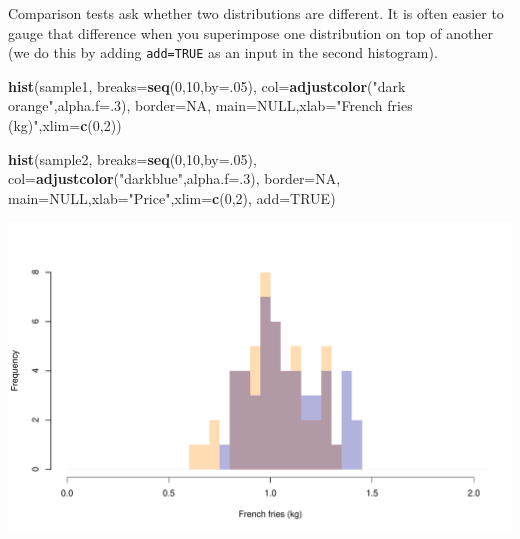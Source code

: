 \documentclass[
]{book}
\newenvironment{Shaded}{\begin{snugshade}}{\end{snugshade}}
\newcommand{\DataTypeTok}[1]{\textcolor[rgb]{0.13,0.29,0.53}{#1}}
\newcommand{\DecValTok}[1]{\textcolor[rgb]{0.00,0.00,0.81}{#1}}
\newcommand{\KeywordTok}[1]{\textcolor[rgb]{0.13,0.29,0.53}{\textbf{#1}}}
\newcommand{\NormalTok}[1]{#1}
\newcommand{\OtherTok}[1]{\textcolor[rgb]{0.56,0.35,0.01}{#1}}
\newcommand{\StringTok}[1]{\textcolor[rgb]{0.31,0.60,0.02}{#1}}
\begin{document}
Comparison tests ask whether two distributions are different. It is often easier to gauge that difference when you superimpose one distribution on top of another (we do this by adding \texttt{add=TRUE} as an input in the second histogram).

\begin{Shaded}
\begin{Highlighting}[]
\KeywordTok{hist}\NormalTok{(sample1,}
     \DataTypeTok{breaks=}\KeywordTok{seq}\NormalTok{(}\DecValTok{0}\NormalTok{,}\DecValTok{10}\NormalTok{,}\DataTypeTok{by=}\NormalTok{.}\DecValTok{05}\NormalTok{),}
     \DataTypeTok{col=}\KeywordTok{adjustcolor}\NormalTok{(}\StringTok{"dark orange"}\NormalTok{,}\DataTypeTok{alpha.f=}\NormalTok{.}\DecValTok{3}\NormalTok{),}
     \DataTypeTok{border=}\OtherTok{NA}\NormalTok{,}
     \DataTypeTok{main=}\OtherTok{NULL}\NormalTok{,}\DataTypeTok{xlab=}\StringTok{"French fries (kg)"}\NormalTok{,}\DataTypeTok{xlim=}\KeywordTok{c}\NormalTok{(}\DecValTok{0}\NormalTok{,}\DecValTok{2}\NormalTok{))}

\KeywordTok{hist}\NormalTok{(sample2,}
     \DataTypeTok{breaks=}\KeywordTok{seq}\NormalTok{(}\DecValTok{0}\NormalTok{,}\DecValTok{10}\NormalTok{,}\DataTypeTok{by=}\NormalTok{.}\DecValTok{05}\NormalTok{),}
     \DataTypeTok{col=}\KeywordTok{adjustcolor}\NormalTok{(}\StringTok{"darkblue"}\NormalTok{,}\DataTypeTok{alpha.f=}\NormalTok{.}\DecValTok{3}\NormalTok{),}
     \DataTypeTok{border=}\OtherTok{NA}\NormalTok{,}
     \DataTypeTok{main=}\OtherTok{NULL}\NormalTok{,}\DataTypeTok{xlab=}\StringTok{"Price"}\NormalTok{,}\DataTypeTok{xlim=}\KeywordTok{c}\NormalTok{(}\DecValTok{0}\NormalTok{,}\DecValTok{2}\NormalTok{),}
     \DataTypeTok{add=}\OtherTok{TRUE}\NormalTok{)}
\end{Highlighting}
\end{Shaded}

\includegraphics{figures/unnamed-chunk-180-1.pdf}
\end{document}
